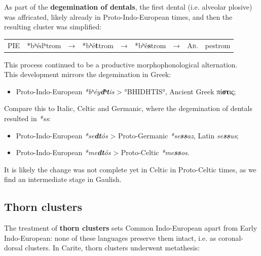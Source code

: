 \documentclass[svgnames,x11names,b5paper]{book}
\begin{document}
        As part of the \textbf{degemination of dentals}, the first dental (i.e. alveolar plosive) was affricated, likely already in Proto-Indo-European times, and then the resulting cluster was simplified:

            \begin{table}[H]
                \begin{center}
                \begin{tabular}{llcllllll}
                \textsc{PIE} & *bʰédʰtrom & → & *bʰé\textbf{t}trom & → & *bʰé\textbf{s}trom & → & \textsc{Ab.} & pestrom\\
                \end{tabular}
                \end{center}
                \end{table}
        
            This process continued to be a productive morphophonological alternation.\\
This development mirrors the degemination in Greek:
\begin{itemize}
\item  Proto-Indo-European \textit{*bʰéy\textbf{dʰt}is} > °BHIDHTIS°, Ancient Greek πί\textbf{στ}ις;\\
\end{itemize}
Compare this to Italic, Celtic and Germanic, where the degemination of dentals resulted in \textit{*ss}:
\begin{itemize}
\item  Proto-Indo-European \textit{*se\textbf{dt}ós} > Proto-Germanic \textit{*se\textbf{ss}az}, Latin \textit{se\textbf{ss}us};\\
\item  Proto-Indo-European \textit{*me\textbf{dt}ós} > Proto-Celtic \textit{*me\textbf{ss}os}.\\
\end{itemize}
It is likely the change was not complete yet in Celtic in Proto-Celtic times, as we find an intermediate stage in Gaulish.

            \subsection{Thorn clusters}
        
        The treatment of \textbf{thorn clusters} sets Common Indo-European apart from Early Indo-European: none of these languages preserve them intact, i.e. as coronal-dorsal clusters. In Carite, thorn clusters underwent metathesis:
\end{document}
